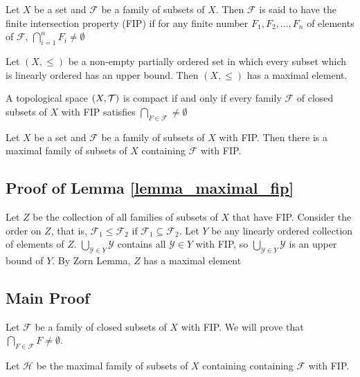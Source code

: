 \documentclass{article}
\begin{document}
\begin{definition}
    Let $X$ be a set and $\mathcal{F}$ be a family of subsets of $X$. Then $\mathcal{F}$ is said to have the finite intersection property (FIP) if for any finite number $F_1, F_2, ..., F_n$ of elements of $\mathcal{F}$, $\bigcap_{i=1}^n F_i \neq \emptyset$
\end{definition}

\begin{axiom}
    Let $(X, \leq)$ be a non-empty partially ordered set in which every subset which is linearly ordered has an upper bound. Then $(X, \leq)$ has a maximal element.
\end{axiom}

\begin{proposition}[Compactness]
    A topological space $(X, \mathcal{T})$ is compact if and only if every family $\mathcal{F}$ of closed subsets of $X$ with FIP satisfies $\bigcap_{F \in \mathcal{F}} \neq \emptyset$
\end{proposition}

\begin{lemma}
    \label{lemma_maximal_fip}
    Let $X$ be a set and $\mathcal{F}$ be a family of subsets of $X$ with FIP. Then there is a maximal family of subsets of $X$ containing $\mathcal{F}$ with FIP.
\end{lemma}

\subsection*{Proof of Lemma \ref{lemma_maximal_fip}}
Let $Z$ be the collection of all families of subsets of $X$ that have FIP. Consider the order on $Z$, that is, $\mathcal{F}_1 \leq \mathcal{F}_2$ if $\mathcal{F}_1 \subseteq \mathcal{F}_2$. Let $Y$ be any linearly ordered collection of elements of $Z$. $\bigcup_{\mathcal{Y} \in Y} \mathcal{Y}$ contains all $\mathcal{Y} \in Y$ with FIP, so $\bigcup_{\mathcal{Y} \in Y} \mathcal{Y}$ is an upper bound of $Y$.
By Zorn Lemma, $Z$ has a maximal element

\subsection*{Main Proof}

Let $\mathcal{F}$ be a family of closed subsets of $X$ with FIP. We will prove that $\bigcap_{F \in \mathcal{F}} F \neq \emptyset$.

Let $\mathcal{H}$ be the maximal family of subsets of $X$ containing containing $\mathcal{F}$ with FIP.
\end{document}
